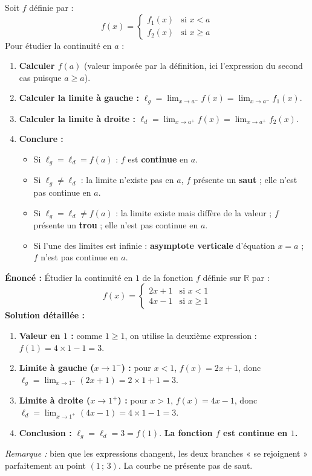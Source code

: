 \documentclass[11pt]{article}
\begin{document}
\begin{methode}
Soit $f$ définie par :
\[
f(x) = \begin{cases}
f_1(x) & \text{si } x < a \\
f_2(x) & \text{si } x \ge a
\end{cases}
\]
Pour étudier la continuité en $a$ :
\begin{enumerate}
    \item \textbf{Calculer $f(a)$} (valeur imposée par la définition, ici l'expression du second cas puisque $a \ge a$).
    \item \textbf{Calculer la limite à gauche :} $\ell_g = \lim_{x \to a^-} f(x) = \lim_{x \to a^-} f_1(x)$.
    \item \textbf{Calculer la limite à droite :} $\ell_d = \lim_{x \to a^+} f(x) = \lim_{x \to a^+} f_2(x)$.
    \item \textbf{Conclure :}
    \begin{itemize}
        \item Si $\ell_g = \ell_d = f(a)$ : $f$ est \textbf{continue} en $a$.
        \item Si $\ell_g \neq \ell_d$ : la limite n'existe pas en $a$, $f$ présente un \textbf{saut} ; elle n'est pas continue en $a$.
        \item Si $\ell_g = \ell_d \neq f(a)$ : la limite existe mais diffère de la valeur ; $f$ présente un \textbf{trou} ; elle n'est pas continue en $a$.
        \item Si l'une des limites est infinie : \textbf{asymptote verticale} d'équation $x=a$ ; $f$ n'est pas continue en $a$.
    \end{itemize}
\end{enumerate}
\end{methode}

\begin{exoresolu}
\textbf{Énoncé :} Étudier la continuité en $1$ de la fonction $f$ définie sur $\mathbb{R}$ par :
\[
f(x) = \begin{cases}
2x + 1 & \text{si } x < 1 \\
4x - 1 & \text{si } x \ge 1
\end{cases}
\]
\tcblower
\textbf{Solution détaillée :}
\begin{enumerate}
    \item \textbf{Valeur en $1$ :} comme $1 \ge 1$, on utilise la deuxième expression : $f(1) = 4\times 1 - 1 = 3$.
    \item \textbf{Limite à gauche ($x \to 1^-$) :} pour $x<1$, $f(x)=2x+1$, donc
    $\ell_g = \lim_{x \to 1^-} (2x+1) = 2\times 1 + 1 = 3$.
    \item \textbf{Limite à droite ($x \to 1^+$) :} pour $x>1$, $f(x)=4x-1$, donc
    $\ell_d = \lim_{x \to 1^+} (4x-1) = 4\times 1 - 1 = 3$.
    \item \textbf{Conclusion :} $\ell_g = \ell_d = 3 = f(1)$.
    \textbf{La fonction $f$ est continue en $1$.}
\end{enumerate}
\emph{Remarque :} bien que les expressions changent, les deux branches « se rejoignent » parfaitement au point $(1\,;\,3)$. La courbe ne présente pas de saut.
\end{exoresolu}
\end{document}
